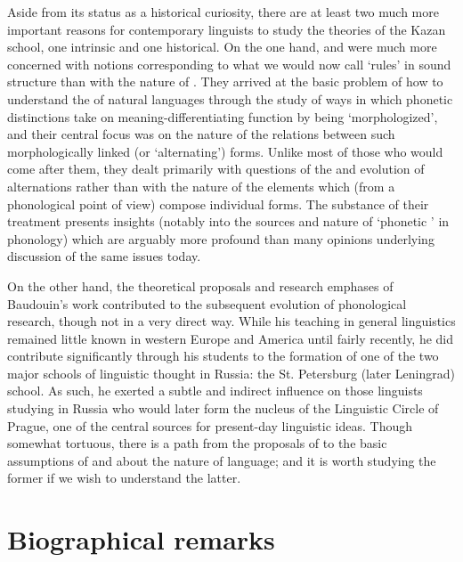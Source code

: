 Aside from its status as a historical curiosity, there are at least
two much more important reasons for contemporary linguists to study
the theories of the Kazan school, one intrinsic and one historical. On
the one hand, {\Baudouin} and {\Kruszewski} were much more concerned with
notions corresponding to what we would now call `rules' in sound
structure than with the nature of . They arrived at the
basic problem of how to understand the  of natural
languages through the study of ways in which phonetic distinctions
take on meaning-differentiating function by being `morphologized', and
their central focus was on the nature of the relations between such
morphologically linked (or `alternating') forms. Unlike most of those
who would come after them, they dealt primarily with questions of the
 and evolution of alternations rather than with the nature of
the elements which (from a phonological point of view) compose
individual forms. The substance of their treatment presents insights
(notably into the sources and nature of `phonetic ' in
phonology) which are arguably more profound than many opinions
underlying discussion of the same issues today.

On the other hand, the theoretical proposals and research emphases of
Baudouin's work contributed to the subsequent evolution of
phonological research, though not in a very direct way. While his
teaching in general linguistics remained little known in western
Europe and America until fairly recently, he did contribute
significantly through his students to the formation of one of the two
major schools of linguistic thought in Russia: the St. Petersburg
(later Leningrad) school. As such, he exerted a subtle and indirect
influence on those linguists studying in Russia who would later form
the {nucleus} of the {Linguistic Circle of Prague}, one of the central
sources for present-day linguistic ideas. Though somewhat tortuous,
there is a path from the proposals of {\DeCourtenay} to the
basic assumptions of {\Trubetzkoy} and {\Jakobson} about the nature of
language; and it is worth studying the former if we wish to understand
the latter.

\section{Biographical remarks}


